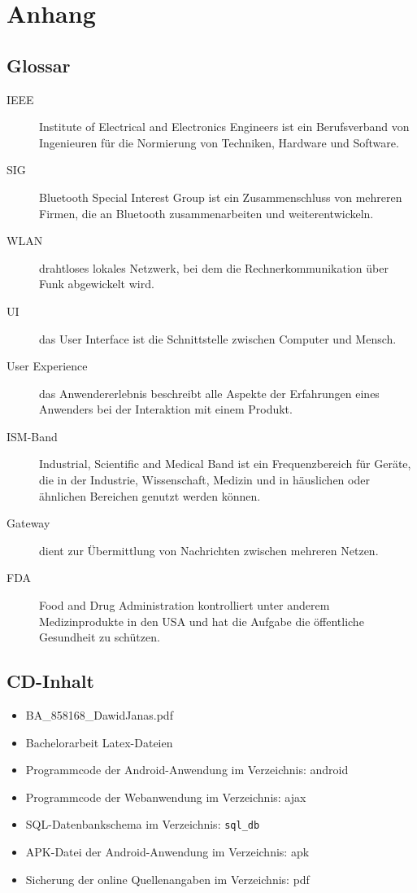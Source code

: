 

\chapter{Anhang}

\section{Glossar}

\begin{description}
 \item [IEEE] Institute of Electrical and Electronics Engineers ist ein Berufsverband von Ingenieuren
 f\"ur die Normierung von Techniken, Hardware und Software.
 \item [SIG] Bluetooth Special Interest Group ist ein Zusammenschluss von mehreren Firmen, die an
 Bluetooth zusammenarbeiten und weiterentwickeln.
 \item [WLAN] drahtloses lokales Netzwerk, bei dem die Rechnerkommunikation \"uber Funk abgewickelt wird.
 \item [UI] das User Interface ist die Schnittstelle zwischen Computer und Mensch.
 \item [User Experience] das Anwendererlebnis beschreibt alle Aspekte der Erfahrungen eines
 Anwenders bei der Interaktion mit einem Produkt.
 \item [ISM-Band] Industrial, Scientific and Medical Band ist ein Frequenzbereich f\"ur Ger\"ate,
 die in der Industrie, Wissenschaft, Medizin und in h\"auslichen oder \"ahnlichen Bereichen genutzt werden k\"onnen. 
 \item [Gateway] dient zur \"Ubermittlung von Nachrichten zwischen mehreren Netzen.
 \item [FDA] Food and Drug Administration kontrolliert unter anderem Medizinprodukte in den USA und hat die Aufgabe 
 die \"offentliche Gesundheit zu sch\"utzen. 
 \end{description}

\section{CD-Inhalt}
\begin{itemize}
 \item BA\_858168\_DawidJanas.pdf
 \item Bachelorarbeit Latex-Dateien
 \item Programmcode der Android-Anwendung im Verzeichnis: android
 \item Programmcode der Webanwendung im Verzeichnis: ajax
 \item SQL-Datenbankschema im Verzeichnis: \texttt{sql\_db}
 \item APK-Datei der Android-Anwendung im Verzeichnis: apk
 \item Sicherung der online Quellenangaben im Verzeichnis: pdf
\end{itemize}
